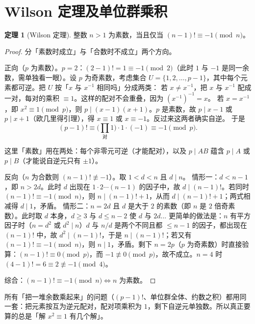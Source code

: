 \documentclass[UTF8,a4paper,11pt,twoside,openright,fontset=fandol]{ctexbook}
\theoremstyle{definition}
\newtheorem{theorem}[definition]{定理}
\begin{document}
\section{Wilson 定理及单位群乘积}
\begin{theorem}[Wilson 定理]
整数 $n>1$ 为素数，当且仅当 $(n-1)!\equiv-1\pmod n$。
\end{theorem}
\begin{proof}
分「素数时成立」与「合数时不成立」两个方向。

正向（$p$ 为素数）。$p=2$：$(2-1)!=1\equiv-1\pmod2$（此时 $1$ 与 $-1$ 是同一余数，需单独看一眼）。设 $p$ 为奇素数，考虑集合 $U=\{1,2,\ldots,p-1\}$，其中每个元素都可逆。把 $U$ 按「$x$ 与 $x^{-1}$ 相同吗」分成两类：
若 $x\ne x^{-1}$，把 $x$ 与 $x^{-1}$ 配成一对，每对的乘积 $\equiv1$。这样的配对不会重叠，因为 $(x^{-1})^{-1}=x$。
若 $x=x^{-1}$，即 $x^2\equiv1\pmod p$，则 $p\mid(x-1)(x+1)$。$p$ 是素数，故 $p\mid x-1$ 或 $p\mid x+1$（欧几里得引理），得 $x\equiv1$ 或 $x\equiv-1$。反过来这两者确实自逆。
于是
\[
 (p-1)!\equiv\Big(\prod_{\text{对}}1\Big)\cdot1\cdot(-1)\equiv-1\pmod p .
\]



这里「素数」用在两处：每个非零元可逆（才能配对），以及 $p\mid AB$ 蕴含 $p\mid A$ 或 $p\mid B$（才能说自逆元只有 $\pm1$）。

反向（$n$ 为合数则 $(n-1)!\not\equiv-1$）。取 $1<d<n$ 且 $d\mid n$。
情形一：$d<n-1$，即 $n>2d$。此时 $d$ 出现在 $1\cdot2\cdots(n-1)$ 的因子中，故 $d\mid(n-1)!$。若同时 $(n-1)!\equiv-1\pmod n$，则 $n\mid(n-1)!+1$，从而 $d\mid(n-1)!+1$；两式相减得 $d\mid1$，矛盾。
情形二：$n=2d$ 且 $d$ 是大于 $2$ 的素数（即 $n$ 是 $2$ 倍奇素数）。此时取 $d$ 本身，$d\ge3$ 与 $d\le n-2$ 使 $d$ 与 $2d$... 更简单的做法是：$n$ 有平方因子时（$n=d^2$ 或 $d^2\mid n$）$d$ 与 $n/d$ 是两个不同且都 $\le n-1$ 的因子，都出现在 $(n-1)!$ 中，故 $d^2\mid(n-1)!$，于是 $n\mid(n-1)!$；若又有 $(n-1)!\equiv-1\pmod n$，则 $n\mid1$，矛盾。剩下 $n=2p$（$p$ 为奇素数）时直接验算：$(n-1)!\equiv0\pmod p$，而 $-1\not\equiv0\pmod p$，故不成立。$n=4$ 时 $(4-1)!=6\equiv2\not\equiv-1\pmod4$。

综合：$(n-1)!\equiv-1\pmod n\iff n$ 为素数。
\end{proof}

\begin{tip}[一节里其实在算什么乘积]
所有「把一堆余数乘起来」的问题（$(p-1)!$、单位群全体、约数之积）都用同一套：把元素按互为逆元配对，配对项乘积为 $1$，剩下自逆元单独数。所以真正要算的总是「解 $x^2\equiv1$ 有几个解」。
\end{tip}
\end{document}
